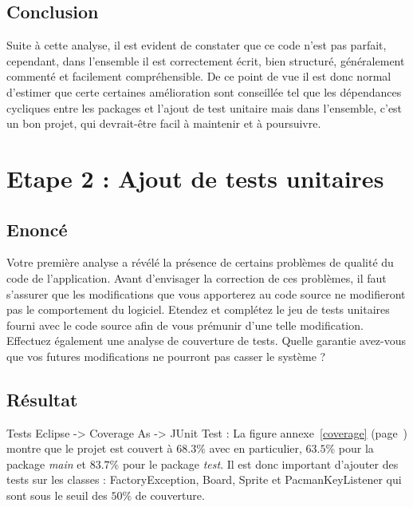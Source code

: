 \documentclass[12pt,a4paper,final]{article}
\newcommand{\annexe}[1]{annexe~\ref{#1} (page~\pageref{#1})}
\begin{document}
\subsection{Conclusion}
Suite à cette analyse, il est evident de constater que ce code n'est pas parfait, cependant, dans l'ensemble il est correctement écrit, bien structuré, généralement commenté et facilement compréhensible. De ce point de vue il est donc normal d'estimer que certe certaines amélioration sont conseillée tel que les dépendances cycliques entre les packages et l'ajout de test unitaire mais dans l'ensemble, c'est un bon projet, qui devrait-être facil à maintenir et à poursuivre.

\newpage
\clearpage
\section{Etape 2 : Ajout de tests unitaires}\label{sec:etape2}
\subsection{Enoncé}
Votre première analyse a révélé la présence de certains problèmes de qualité du code de l'application.
Avant d'envisager la correction de ces problèmes, il faut s'assurer que les modifications que vous apporterez au code source ne modifieront pas le comportement du logiciel.
Etendez et complétez le jeu de tests unitaires fourni avec le code source afin de vous prémunir d'une telle modification. Effectuez également une analyse de couverture de tests.
Quelle garantie avez-vous que vos futures modifications ne pourront pas casser le système ?

\subsection{Résultat}

Tests  Eclipse -> Coverage As -> JUnit Test : La figure \annexe{coverage} montre que le projet est couvert à $68.3 \%$ avec en particulier, $63.5\%$ pour la package \emph{main} et $83.7\%$ pour le package \emph{test}.
 Il est donc important d'ajouter des tests sur les classes : FactoryException, Board, Sprite et PacmanKeyListener qui sont sous le seuil des $50 \%$ de couverture.

\newpage
\end{document}
